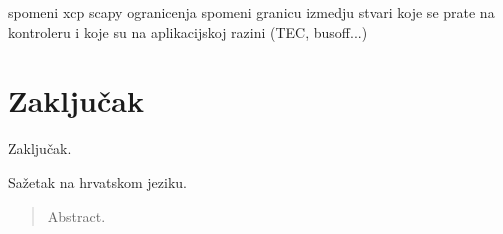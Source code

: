 \documentclass[times, utf8, diplomski, numeric]{fer}
\begin{document}
spomeni xcp scapy ogranicenja
spomeni granicu izmedju stvari koje se prate na kontroleru i koje su na aplikacijskoj razini (TEC, busoff...)
\chapter{Zaključak}
 Zaključak.






\begin{sazetak}
Sažetak na hrvatskom jeziku.

\end{sazetak}

\begin{abstract}
Abstract.

\end{abstract}
\end{document}
